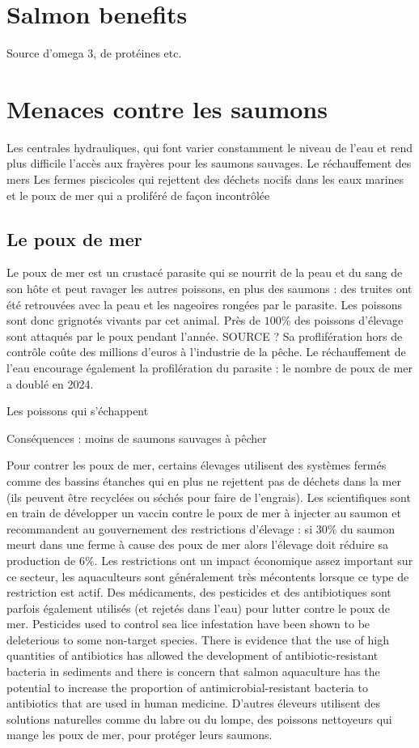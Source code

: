 \documentclass{article}
\begin{document}
\section{Salmon benefits}
Source d'omega 3, de protéines etc.

\section{Menaces contre les saumons}
Les centrales hydrauliques, qui font varier constamment le niveau de l'eau et rend plus difficile l'accès aux frayères pour les saumons sauvages.
Le réchauffement des mers
Les fermes piscicoles qui rejettent des déchets nocifs dans les eaux marines et le poux de mer qui a proliféré de façon incontrôlée

\subsection{Le poux de mer}
Le poux de mer est un crustacé parasite qui se nourrit de la peau et du sang de son hôte et peut ravager les autres poissons, en plus des saumons : des truites ont été retrouvées avec la peau et les nageoires rongées par le parasite. Les poissons sont donc grignotés vivants par cet animal.
Près de $100\%$ des poissons d'élevage sont attaqués par le poux pendant l'année. SOURCE ?
Sa proflifération hors de contrôle coûte des millions d'euros à l'industrie de la pêche. Le réchauffement de l'eau encourage également la profilération du parasite : le nombre de poux de mer a doublé en 2024.



Les poissons qui s'échappent

Conséquences : moins de saumons sauvages à pêcher


Pour contrer les poux de mer, certains élevages utilisent des systèmes fermés comme des bassins étanches qui en plus ne rejettent pas de déchets dans la mer (ils peuvent être recyclées ou séchés pour faire de l'engrais).
Les scientifiques sont en train de développer un vaccin contre le poux de mer à injecter au saumon et recommandent au gouvernement des restrictions d'élevage : si $30 \%$ du saumon meurt dans une ferme à cause des poux de mer alors l'élevage doit réduire sa production de $6 \%$.
Les restrictions ont un impact économique assez important sur ce secteur, les aquaculteurs sont généralement très mécontents lorsque ce type de restriction est actif.
Des médicaments, des pesticides et des antibiotiques \cite{FT2} \cite{FT3} sont parfois également utilisés (et rejetés dans l'eau) pour lutter contre le poux de mer. 
Pesticides used to control sea lice infestation have been shown to be deleterious to some non-target species. 
There is evidence that the use of high quantities of antibiotics has allowed the development of antibiotic-resistant bacteria in sediments and there is concern that salmon aquaculture has the potential to increase the proportion of antimicrobial-resistant bacteria to antibiotics that are used in human medicine.
D'autres éleveurs utilisent des solutions naturelles comme du labre ou du lompe, des poissons nettoyeurs qui mange les poux de mer, pour protéger leurs saumons.
\end{document}
